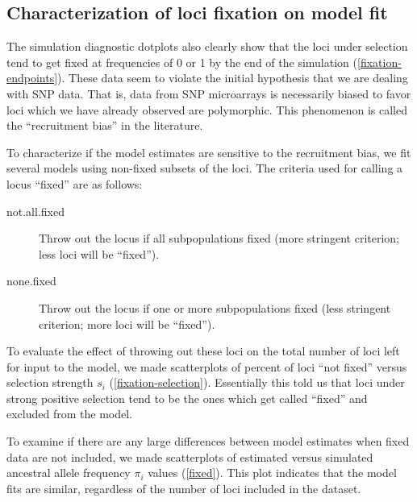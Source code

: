 \documentclass[a4paper,12pt]{article}
\begin{document}
\subsection{Characterization of loci fixation on model fit}

The simulation diagnostic dotplots also clearly show that the loci
under selection tend to get fixed at frequencies of 0 or 1 by the end
of the simulation (\autoref{fixation-endpoints}). These data seem to
violate the initial hypothesis that we are dealing with SNP data. That
is, data from SNP microarrays is necessarily biased to favor loci
which we have already observed are polymorphic. This phenomenon is
called the ``recruitment bias'' in the literature.

To characterize if the model estimates are sensitive to the
recruitment bias, we fit several models using non-fixed subsets of the
loci. The criteria used for calling a locus ``fixed'' are as follows:
\begin{description}
\item[not.all.fixed] Throw out the locus if all subpopulations fixed
  (more stringent criterion; less loci will be ``fixed'').
\item[none.fixed] Throw out the locus if one or more subpopulations
  fixed (less stringent criterion; more loci will be ``fixed'').
\end{description}


To evaluate the effect of throwing out these loci on the total number
of loci left for input to the model, we made scatterplots of percent
of loci ``not fixed'' versus selection strength $s_i$
(\autoref{fixation-selection}). Essentially this told us that loci
under strong positive selection tend to be the ones which get called
``fixed'' and excluded from the model.


To examine if there are any large differences between model estimates
when fixed data are not included, we made scatterplots of estimated
versus simulated ancestral allele frequency $\pi_i$ values
(\autoref{fixed}). This plot indicates that the model fits are
similar, regardless of the number of loci included in the dataset.
\end{document}
